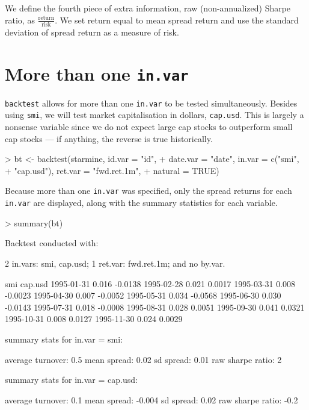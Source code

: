 \documentclass[a4paper]{report}
\begin{document}
\begin{article}
We define the fourth piece of extra information, raw (non-annualized)
Sharpe ratio, as $\frac{\textrm{return}}{\textrm{risk}}$. We set
return equal to mean spread return and use the standard deviation of
spread return as a measure of risk.

\section*{More than one \texttt{in.var}}

\texttt{backtest} allows for more than one \texttt{in.var} to be
tested simultaneously. Besides using \texttt{smi}, we will test market
capitalisation in dollars, \texttt{cap.usd}. This is largely a
nonsense variable since we do not expect large cap stocks to
outperform small cap stocks --- if anything, the reverse is true
historically.


\begin{Schunk}
\begin{Sinput}
> bt <- backtest(starmine, id.var = "id", 
+     date.var = "date", in.var = c("smi", 
+         "cap.usd"), ret.var = "fwd.ret.1m", 
+     natural = TRUE)
\end{Sinput}
\end{Schunk}


Because more than one \texttt{in.var} was specified, only the spread
returns for each \texttt{in.var} are displayed, along with the summary
statistics for each variable.

\begin{Schunk}
\begin{Sinput}
> summary(bt)
\end{Sinput}
\begin{Soutput}
Backtest conducted with:

2 in.vars: smi, cap.usd;
1 ret.var: fwd.ret.1m;
and no by.var.

             smi cap.usd
1995-01-31 0.016 -0.0138
1995-02-28 0.021  0.0017
1995-03-31 0.008 -0.0023
1995-04-30 0.007 -0.0052
1995-05-31 0.034 -0.0568
1995-06-30 0.030 -0.0143
1995-07-31 0.018 -0.0008
1995-08-31 0.028  0.0051
1995-09-30 0.041  0.0321
1995-10-31 0.008  0.0127
1995-11-30 0.024  0.0029

summary stats for in.var = smi:

average turnover: 0.5
mean spread: 0.02
sd spread: 0.01
raw sharpe ratio: 2

summary stats for in.var = cap.usd:

average turnover: 0.1
mean spread: -0.004
sd spread: 0.02
raw sharpe ratio: -0.2
\end{Soutput}
\end{Schunk}


\end{article}
\end{document}
